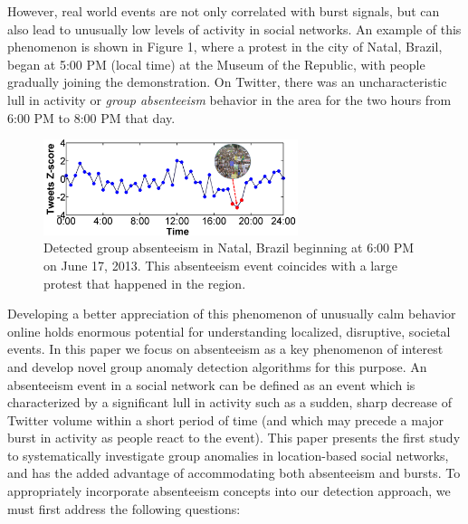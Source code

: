 However, real world events are not only correlated with burst signals, but can also lead to unusually low levels of activity in social networks. An example of this phenomenon
is shown in Figure 1, where a protest in the city of Natal, Brazil, began at 5:00 PM (local time) at the Museum of the Republic, with people gradually joining the demonstration. %
On Twitter, there was an uncharacteristic lull in activity or {\it group absenteeism} behavior in the area for the two hours from 6:00 PM to 8:00 PM that day.

\begin{figure}[t]
\centering
\includegraphics[height=1.1in]{figures/Natal_example1.png}
\caption{Detected group absenteeism in Natal, Brazil beginning at 6:00 PM on June 17, 2013. This absenteeism event coincides with a large protest that happened in the region.}
\label{fig:natal-protest}
\end{figure}

Developing a better appreciation of this phenomenon of unusually calm behavior online holds enormous potential for understanding localized, disruptive, societal events. In this paper we focus on absenteeism as a key phenomenon of interest and develop novel group anomaly detection algorithms for this purpose.
An absenteeism event in a social network can be defined as an event which is characterized by a significant lull in activity such as a sudden, sharp decrease of Twitter volume within a short period of time (and which may precede a major burst in activity as people react to the event). This paper presents the first study to systematically investigate group anomalies in location-based social networks, and has the added advantage of accommodating
both absenteeism and bursts. To appropriately incorporate absenteeism concepts into our detection approach, we must first address the following questions:

